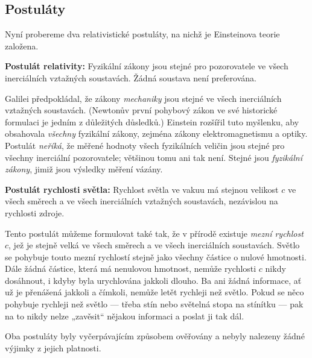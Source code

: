       \subsection{Postuláty}
        Nyní probereme dva relativistické postuláty, na nichž je Einsteinova teorie založena.

        \begin{mdframed}[style=mdmathdef] 
          \textbf{Postulát relativity:} Fyzikální zákony jsou stejné pro pozorovatele ve všech
          inerciálních vztažných soustavách. Žádná soustava není preferována.
        \end{mdframed}

        Galilei předpokládal, že zákony \emph{mechaniky} jsou stejné ve všech inerciálních vztažných
        soustavách. (Newtonův první pohybový zákon ve své historické formulaci je jedním z
        důležitých důsledků.) Einstein rozšířil tuto myšlenku, aby obsahovala \emph{všechny}
        fyzikální zákony, zejména zákony elektromagnetismu a optiky. Postulát \emph{neříká}, že
        měřené hodnoty všech fyzikálních veličin jsou stejné pro všechny inerciální pozorovatele;
        většinou tomu ani tak není. Stejné jsou \emph{fyzikální zákony}, jimiž jsou výsledky měření
        vázány.

        \begin{mdframed}[style=mdmathdef]           
          \textbf{Postulát rychlosti světla:} Rychlost světla ve vakuu má stejnou velikost \(c\) ve
          všech směrech a ve všech inerciálních vztažných soustavách, nezávislou na rychlosti
          zdroje.
        \end{mdframed}

        Tento postulát můžeme formulovat také tak, že v přírodě existuje \emph{mezní rychlost}
        \(c\), jež je stejně velká ve všech směrech a ve všech inerciálních soustavách. Světlo se
        pohybuje touto mezní rychlostí stejně jako všechny částice o nulové hmotnosti. Dále žádná
        částice, která má nenulovou hmotnost, nemůže rychlosti \(c\) nikdy dosáhnout, i kdyby byla
        urychlována jakkoli dlouho. Ba ani žádná informace, ať už je přenášená jakkoli a čímkoli,
        nemůže letět rychleji než světlo. Pokud se něco pohybuje rychleji než světlo — třeba stín
        nebo světelná stopa na stínítku — pak na to nikdy nelze „zavěsit“ nějakou informaci a poslat
        ji tak dál.

        Oba postuláty byly vyčerpávajícím způsobem ověřovány a nebyly nalezeny žádné výjimky z
        jejich platnosti.
      
